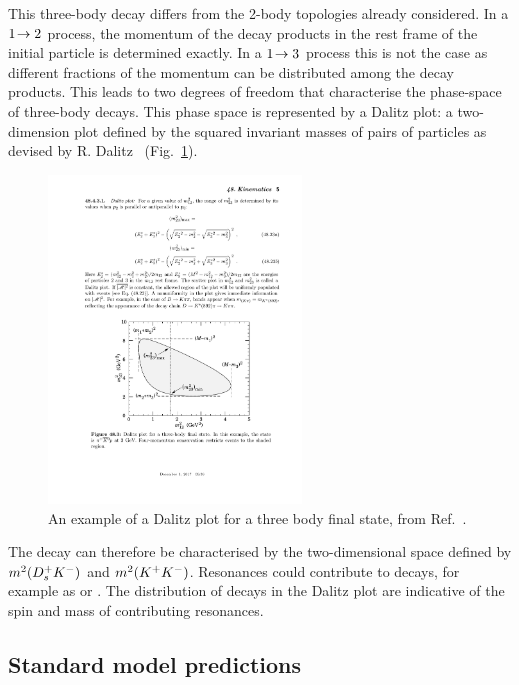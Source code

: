 This three-body decay differs from the 2-body topologies already considered. In a $1\!\rightarrow 2$ process, the momentum of the decay products in the rest frame of the initial particle is determined exactly. In a $1\!\rightarrow 3$ process this is not the case as different fractions of the momentum can be distributed among the decay products. This leads to two degrees of freedom that characterise the phase-space of three-body decays. This phase space is represented by a Dalitz plot: a two-dimension plot defined by the squared invariant masses of pairs of particles as devised by R. Dalitz~\cite{PhysRev.94.1046} (Fig.~\ref{fig:Theory_Dalitz}).
\begin{figure}[!h]
    \centering
    \includegraphics[width=0.6\textwidth]{figs/Theory/DalitzpPlot.pdf}
    \caption{An example of a Dalitz plot for a three body final state, from Ref.~\cite{PDG2016}.}
    \label{fig:Theory_Dalitz}   
\end{figure}
The decay \decay{\Bp}{\Dsp\Kp\Km} can therefore be characterised by the two-dimensional space defined by $m^{2}({{D}^+_{s}}{{K}^-})$ and $m^{2}({{K}^+}{{K}^-})$. Resonances could contribute to \decay{\Bp}{\Dsp\Kp\Km} decays, for example as  or . The distribution of decays in the Dalitz plot are indicative of the spin and mass of contributing resonances.


\subsection{Standard model predictions}

